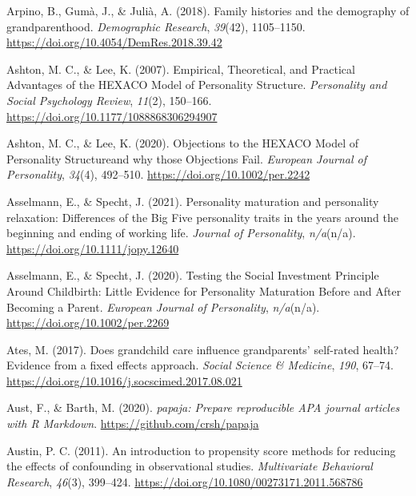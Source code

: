 \documentclass[
  english,
  man, noextraspace]{apa7}
\begin{document}
\leavevmode\hypertarget{ref-arpinoFamilyHistoriesDemography2018}{}%
Arpino, B., Gumà, J., \& Julià, A. (2018). Family histories and the demography of grandparenthood. \emph{Demographic Research}, \emph{39}(42), 1105--1150. \url{https://doi.org/10.4054/DemRes.2018.39.42}

\leavevmode\hypertarget{ref-ashtonEmpiricalTheoreticalPractical2007}{}%
Ashton, M. C., \& Lee, K. (2007). Empirical, Theoretical, and Practical Advantages of the HEXACO Model of Personality Structure. \emph{Personality and Social Psychology Review}, \emph{11}(2), 150--166. \url{https://doi.org/10.1177/1088868306294907}

\leavevmode\hypertarget{ref-ashtonObjectionsHEXACOModel2020}{}%
Ashton, M. C., \& Lee, K. (2020). Objections to the HEXACO Model of Personality Structureand why those Objections Fail. \emph{European Journal of Personality}, \emph{34}(4), 492--510. \url{https://doi.org/10.1002/per.2242}

\leavevmode\hypertarget{ref-asselmannPersonalityMaturationPersonality2021}{}%
Asselmann, E., \& Specht, J. (2021). Personality maturation and personality relaxation: Differences of the Big Five personality traits in the years around the beginning and ending of working life. \emph{Journal of Personality}, \emph{n/a}(n/a). \url{https://doi.org/10.1111/jopy.12640}

\leavevmode\hypertarget{ref-asselmannTestingSocialInvestment2020}{}%
Asselmann, E., \& Specht, J. (2020). Testing the Social Investment Principle Around Childbirth: Little Evidence for Personality Maturation Before and After Becoming a Parent. \emph{European Journal of Personality}, \emph{n/a}(n/a). \url{https://doi.org/10.1002/per.2269}

\leavevmode\hypertarget{ref-atesDoesGrandchildCare2017}{}%
Ates, M. (2017). Does grandchild care influence grandparents' self-rated health? Evidence from a fixed effects approach. \emph{Social Science \& Medicine}, \emph{190}, 67--74. \url{https://doi.org/10.1016/j.socscimed.2017.08.021}

\leavevmode\hypertarget{ref-R-papaja}{}%
Aust, F., \& Barth, M. (2020). \emph{papaja: Prepare reproducible APA journal articles with R Markdown}. \url{https://github.com/crsh/papaja}

\leavevmode\hypertarget{ref-austinIntroductionPropensityScore2011}{}%
Austin, P. C. (2011). An introduction to propensity score methods for reducing the effects of confounding in observational studies. \emph{Multivariate Behavioral Research}, \emph{46}(3), 399--424. \url{https://doi.org/10.1080/00273171.2011.568786}
\end{document}

